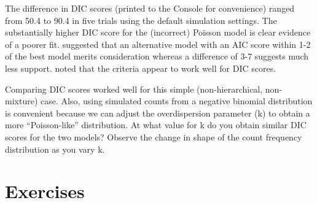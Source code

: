 \documentclass[
]{krantz}
\makeatletter
\newenvironment{Shaded}{\begin{snugshade}}{\end{snugshade}}
\newcommand{\AttributeTok}[1]{\textcolor[rgb]{0.27,0.27,0.27}{#1}}
\newcommand{\CommentTok}[1]{\textcolor[rgb]{0.37,0.37,0.37}{\textit{#1}}}
\newcommand{\DecValTok}[1]{\textcolor[rgb]{0.06,0.06,0.06}{#1}}
\newcommand{\FunctionTok}[1]{\textcolor[rgb]{0.27,0.27,0.27}{\textbf{#1}}}
\newcommand{\NormalTok}[1]{#1}
\newcommand{\OtherTok}[1]{\textcolor[rgb]{0.37,0.37,0.37}{#1}}
\newcommand{\SpecialCharTok}[1]{\textcolor[rgb]{0.43,0.43,0.43}{\textbf{#1}}}
\newcommand{\StringTok}[1]{\textcolor[rgb]{0.5,0.5,0.5}{#1}}
\newenvironment{kframe}{%
\medskip{}
\setlength{\fboxsep}{.8em}
 \def\at@end@of@kframe{}%
 \ifinner\ifhmode%
  \def\at@end@of@kframe{\end{minipage}}%
  \begin{minipage}{\columnwidth}%
 \fi\fi%
 \def\FrameCommand##1{\hskip\@totalleftmargin \hskip-\fboxsep
 \colorbox{shadecolor}{##1}\hskip-\fboxsep
     \hskip-\linewidth \hskip-\@totalleftmargin \hskip\columnwidth}%
 \MakeFramed {\advance\hsize-\width
   \@totalleftmargin\z@ \linewidth\hsize
   \@setminipage}}%
 {\par\unskip\endMakeFramed%
 \at@end@of@kframe}
\renewenvironment{Shaded}{\begin{kframe}}{\end{kframe}}
\makeatother
\begin{document}
\begin{Shaded}
\end{Shaded}

The difference in DIC scores (printed to the Console for convenience) ranged from 50.4 to 90.4 in five trials using the default simulation settings. The substantially higher DIC score for the (incorrect) Poisson model is clear evidence of a poorer fit. \citet{burnham.anderson_1998} suggested that an alternative model with an AIC score within 1-2 of the best model merits consideration whereas a difference of 3-7 suggests much less support. \citet{spiegelhalter.etal_2002} noted that the \citet{burnham.anderson_1998} criteria appear to work well for DIC scores.

Comparing DIC scores worked well for this simple (non-hierarchical, non-mixture) case. Also, using simulated counts from a negative binomial distribution is convenient because we can adjust the overdispersion parameter (k) to obtain a more ``Poisson-like'' distribution. At what value for k do you obtain similar DIC scores for the two models? Observe the change in shape of the count frequency distribution as you vary k.

\hypertarget{exercises-1}{%
\section{Exercises}\label{exercises-1}}
\end{document}
